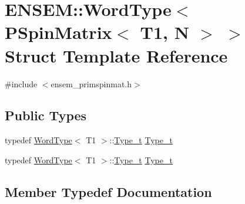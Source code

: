 \hypertarget{structENSEM_1_1WordType_3_01PSpinMatrix_3_01T1_00_01N_01_4_01_4}{}\section{E\+N\+S\+EM\+:\+:Word\+Type$<$ P\+Spin\+Matrix$<$ T1, N $>$ $>$ Struct Template Reference}
\label{structENSEM_1_1WordType_3_01PSpinMatrix_3_01T1_00_01N_01_4_01_4}


{\ttfamily \#include $<$ensem\+\_\+primspinmat.\+h$>$}

\subsection*{Public Types}
\begin{DoxyCompactItemize}
\item 
typedef \mbox{\hyperlink{structENSEM_1_1WordType}{Word\+Type}}$<$ T1 $>$\+::\mbox{\hyperlink{structENSEM_1_1WordType_3_01PSpinMatrix_3_01T1_00_01N_01_4_01_4_a497367a5083738a899e7e09e43127eec}{Type\+\_\+t}} \mbox{\hyperlink{structENSEM_1_1WordType_3_01PSpinMatrix_3_01T1_00_01N_01_4_01_4_a497367a5083738a899e7e09e43127eec}{Type\+\_\+t}}
\item 
typedef \mbox{\hyperlink{structENSEM_1_1WordType}{Word\+Type}}$<$ T1 $>$\+::\mbox{\hyperlink{structENSEM_1_1WordType_3_01PSpinMatrix_3_01T1_00_01N_01_4_01_4_a497367a5083738a899e7e09e43127eec}{Type\+\_\+t}} \mbox{\hyperlink{structENSEM_1_1WordType_3_01PSpinMatrix_3_01T1_00_01N_01_4_01_4_a497367a5083738a899e7e09e43127eec}{Type\+\_\+t}}
\end{DoxyCompactItemize}


\subsection{Member Typedef Documentation}
\mbox{\label{structENSEM_1_1WordType_3_01PSpinMatrix_3_01T1_00_01N_01_4_01_4_a497367a5083738a899e7e09e43127eec}} 
